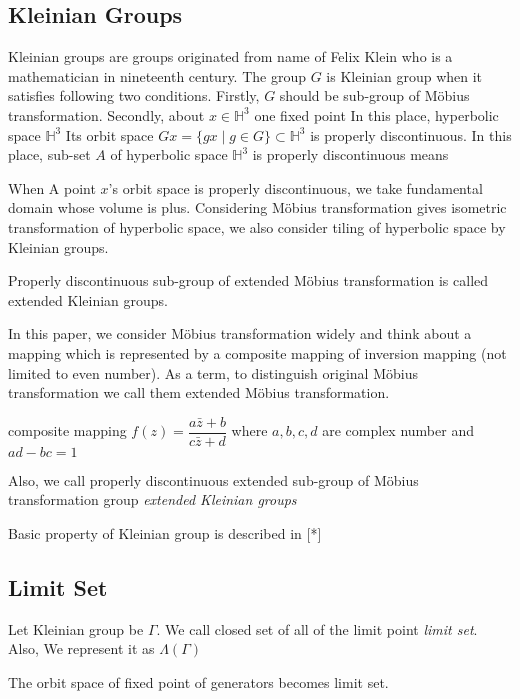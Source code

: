 \subsection{Kleinian Groups}

Kleinian groups are groups originated from name of Felix Klein who is
a mathematician in nineteenth century.
The group $G$ is Kleinian group when it satisfies following two
conditions. 
Firstly, $G$ should be sub-group of M\"obius transformation.
Secondly, about $x\in\mathbb{H}^3$ one fixed point 
In this place, hyperbolic space $\mathbb{H}^3$
Its orbit space $Gx = \{ gx \mid g\in G\}\subset \mathbb{H}^3$
is properly discontinuous.
In this place, sub-set $A$ of hyperbolic space $\mathbb{H}^3$
is properly discontinuous means 

When A point $x$'s orbit space is properly discontinuous, we take
fundamental domain whose volume is plus.
Considering M\"obius transformation gives isometric transformation of
hyperbolic space, we also consider tiling of hyperbolic space by
Kleinian groups. 

Properly discontinuous sub-group of extended M\"obius transformation
is called extended Kleinian groups.

In this paper, we consider M\"obius transformation widely and
think about a mapping which is represented by a  composite mapping of
inversion mapping (not limited to even number).
As a term, to distinguish original M\"obius transformation
we call them extended M\"obius transformation.

composite mapping $f(z)=\dfrac{a{\bar{z}}+b}{c{\bar{z}}+d}$ where
$a, b, c, d$ are complex number and $ad-bc = 1$


Also, we call properly discontinuous extended sub-group of M\"obius
 transformation group \textit{extended Kleinian groups}

Basic property of Kleinian group is described in [*]

\subsection{Limit Set}

Let Kleinian group be $\Gamma$.
We call closed set of all of the limit point \textit{limit set}.
Also, We represent it as $\Lambda(\Gamma)$

The orbit space of fixed point of generators becomes limit set.